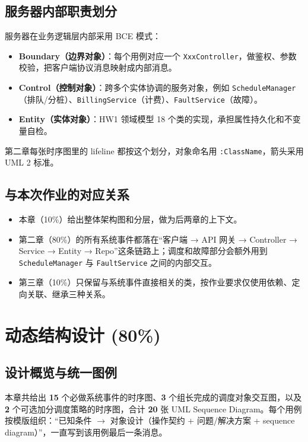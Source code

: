 \documentclass[a4paper,11pt]{ctexart}
\begin{document}
\subsection{服务器内部职责划分}

服务器在业务逻辑层内部采用 BCE 模式：

\begin{itemize}
\item \textbf{Boundary（边界对象）}：每个用例对应一个 \texttt{XxxController}，做鉴权、参数校验，把客户端协议消息映射成内部消息。
\item \textbf{Control（控制对象）}：跨多个实体协调的服务对象，例如 \texttt{ScheduleManager}（排队/分桩）、\texttt{BillingService}（计费）、\texttt{FaultService}（故障）。
\item \textbf{Entity（实体对象）}：HW1 领域模型 18 个类的实现，承担属性持久化和不变量自检。
\end{itemize}

第二章每张时序图里的 lifeline 都按这个划分，对象命名用 \texttt{:ClassName}，箭头采用 UML 2 标准。

\subsection{与本次作业的对应关系}

\begin{itemize}
\item 本章（10\%）给出整体架构图和分层，做为后两章的上下文。
\item 第二章（80\%）的所有系统事件都落在``客户端 → API 网关 → Controller → Service → Entity → Repo''这条链路上；调度和故障部分会额外用到 \texttt{ScheduleManager} 与 \texttt{FaultService} 之间的内部交互。
\item 第三章（10\%）只保留与系统事件直接相关的类，按作业要求仅使用依赖、定向关联、继承三种关系。
\end{itemize}

\clearpage
\section{动态结构设计 (80\%)}

\subsection{设计概览与统一图例}

本章共给出 \textbf{15} 个必做系统事件的时序图、\textbf{3} 个组长完成的调度对象交互图，以及 \textbf{2} 个可选加分调度策略的时序图，合计 \textbf{20} 张 UML Sequence Diagram。每个用例按模版组织：``已知条件 $\to$ 对象设计（操作契约 + 问题/解决方案 + sequence diagram）''，一直写到该用例最后一条消息。
\end{document}
